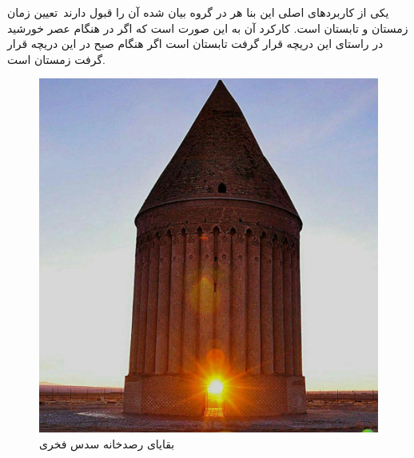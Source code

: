 \documentclass{article}
\begin{document}
	یکی از کاربردهای اصلی این بنا هر در گروه بیان شده آن را قبول دارند تعیین زمان زمستان و تابستان است. کارکرد آن به این صورت است که اگر در هنگام عصر خورشید در راستای این دریچه قرار گرفت تابستان است اگر هنگام صبح در این دریچه قرار گرفت زمستان است.
	\begin{figure}[h!]
			\includegraphics[width=\linewidth]{figures/radkan.jpg}
			\centering
			\caption{بقایای رصدخانه سدس فخری}
			\label{radkantaein}
		\end{figure}
		
		
		
\end{document}
